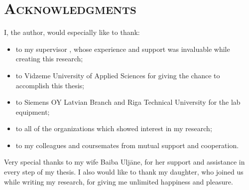 \chapter*{\textsc{Acknowledgments}}

I, the author, would especially like to thank:

\begin{itemize}
	\item to my supervisor \supervisortitle \supervisor, whose experience and support was invaluable while creating this research;
	
	\item to Vidzeme University of Applied Sciences for giving the chance to accomplish this thesis;
	
	\item to Siemens OY Latvian Branch and Riga Technical University for the lab equipment;
	
	\item to all of the organizations which showed interest in my research;
	
	\item to my colleagues and coursemates from mutual support and cooperation.
	
\end{itemize}

Very special thanks to my wife Baiba Uljāne, for her support and assistance in every step of my thesis. I also would like to thank my daughter, who joined us while writing my research, for giving me unlimited happiness and pleasure.
